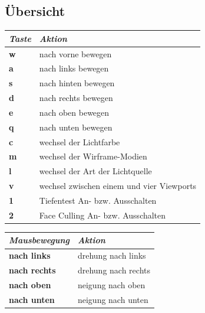 \documentclass{article}
\begin{document}
\subsection{Übersicht}
\begin{minipage}{0.56\textwidth}
\begin{table}[H]
\begin{tabular}{|l|l|}
\hline
\textit{\textbf{Taste}} & \textit{\textbf{Aktion}}                  \\ \hline
\textbf{w}              & nach vorne bewegen                        \\ \hline
\textbf{a}              & nach links bewegen                        \\ \hline
\textbf{s}              & nach hinten bewegen                       \\ \hline
\textbf{d}              & nach rechts bewegen                       \\ \hline
\textbf{e}              & nach oben bewegen                         \\ \hline
\textbf{q}              & nach unten bewegen                        \\ \hline
\textbf{c}              & wechsel der Lichtfarbe                    \\ \hline
\textbf{m}              & wechsel der Wirframe-Modien               \\ \hline
\textbf{l}              & wechsel der Art der Lichtquelle           \\ \hline
\textbf{v}              & wechsel zwischen einem und vier Viewports \\ \hline
\textbf{1}              & Tiefentest An- bzw. Ausschalten           \\ \hline
\textbf{2}              & Face Culling An- bzw. Ausschalten         \\ \hline
\end{tabular}
\end{table}
\end{minipage}
\begin{minipage}[b]{0.3\textwidth}
\begin{table}[H]
\begin{tabular}{|l|l|}
\hline
\textit{\textbf{Mausbewegung}} & \textit{\textbf{Aktion}} \\ \hline
\textbf{nach links}            & drehung nach links       \\ \hline
\textbf{nach rechts}           & drehung nach rechts      \\ \hline
\textbf{nach oben}             & neigung nach oben        \\ \hline
\textbf{nach unten}            & neigung nach unten       \\ \hline
\end{tabular}
\end{table}

\end{minipage}
\end{document}

